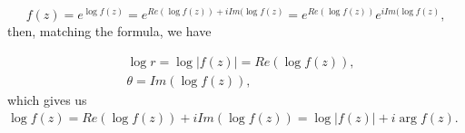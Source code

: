 \documentclass{article}
\begin{document}
\begin{equation*}
f(z)=e^{\log f(z)}=e^{Re(\log f(z))+i Im(\log f(z)}=e^{Re(\log f(z))}e^{i Im(\log f(z)},
\end{equation*}
then, matching the formula, we have

\begin{equation*}
\begin{aligned}
&\log r=\log |f(z)|=Re(\log f(z)),\\
&\theta=Im(\log f(z)),
\end{aligned}
\end{equation*}
which gives us $\log f(z)=Re(\log f(z))+i Im(\log f(z))=\log |f(z)|+i \arg f(z)$.
\end{document}
